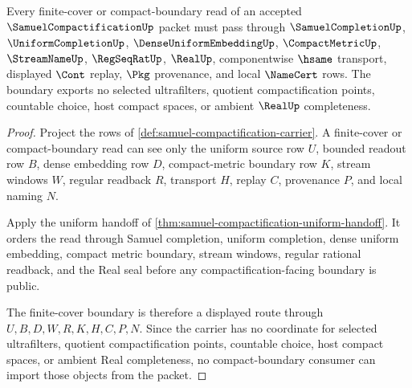 \begin{theorem}
\label{thm:samuel-compactification-finite-cover-boundary}
Every finite-cover or compact-boundary read of an accepted $\SamuelCompactificationUp$ packet must pass through $\SamuelCompletionUp$, $\UniformCompletionUp$, $\DenseUniformEmbeddingUp$, $\CompactMetricUp$, $\StreamNameUp$, $\RegSeqRatUp$, $\RealUp$, componentwise $\hsame$ transport, displayed $\Cont$ replay, $\Pkg$ provenance, and local $\NameCert$ rows. The boundary exports no selected ultrafilters, quotient compactification points, countable choice, host compact spaces, or ambient $\RealUp$ completeness.
\end{theorem}
\begin{proof}
Project the rows of \autoref{def:samuel-compactification-carrier}. A finite-cover or compact-boundary read can see only the uniform source row $U$, bounded readout row $B$, dense embedding row $D$, compact-metric boundary row $K$, stream windows $W$, regular readback $R$, transport $H$, replay $C$, provenance $P$, and local naming $N$.

Apply the uniform handoff of \autoref{thm:samuel-compactification-uniform-handoff}. It orders the read through Samuel completion, uniform completion, dense uniform embedding, compact metric boundary, stream windows, regular rational readback, and the Real seal before any compactification-facing boundary is public.

The finite-cover boundary is therefore a displayed route through $U,B,D,W,R,K,H,C,P,N$. Since the carrier has no coordinate for selected ultrafilters, quotient compactification points, countable choice, host compact spaces, or ambient Real completeness, no compact-boundary consumer can import those objects from the packet.
\end{proof}


